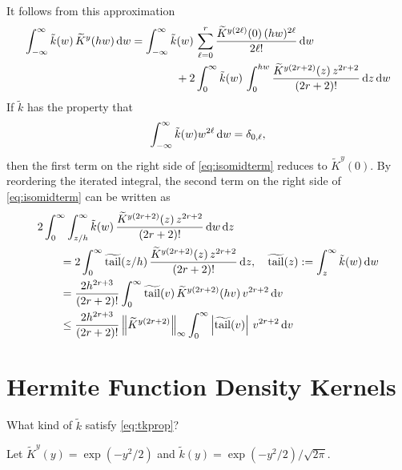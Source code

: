 \documentclass{amsart}
\newcommand{\tKY}{\widetilde{K}^y}
\newcommand{\tk}{\tilde{k}}
\DeclareMathOperator{\ttk}{\widetilde{tail}}
\begin{document}
It follows from this approximation 
\begin{align} \label{eq:isomidterm}
	\int_{-\infty}^{\infty} \tk(w) \, \tKY(hw) \, \dif w & = 
	\int_{-\infty}^{\infty} \tk(w) \, \sum_{\ell = 0}^{r} \frac{\tK^{y(2\ell)}(0) \, (hw)^{2\ell}}{2\ell!}  \, \dif w \\
	& 
	\nonumber
	\qquad \qquad 
	+ 2 \int_{0}^{\infty} \tk(w) \,  \int_0^{hw} \frac{\tK^{y(2r+2)}(z) \,  z^{2r+2}}{(2r+2)!} \, \dif z  \, \dif w
\end{align}
If $\tk$ has the property that 
\begin{equation} \label{eq:tkprop}
	\int_{-\infty}^{\infty} \tk(w) w^{2\ell}  \, \dif w =  \delta_{0,\ell},
\end{equation} 
then the first term on the right side of \eqref{eq:isomidterm} reduces to $\tKY(0)$.   By reordering the iterated integral, the  second term on the right side of  \eqref{eq:isomidterm} can be written as 
\begin{align*}
	\MoveEqLeft{2 \int_{0}^{\infty}  \int_{z/h}^\infty \tk(w) \, \frac{\tK^{y(2r+2)}(z) \,  z^{2r+2}}{(2r+2)!}   \, \dif w \, \dif z} \\
	& =  2\int_{0}^{\infty}  \ttk(z/h) \, \frac{\tK^{y(2r+2)}(z) \,  z^{2r+2}}{(2r+2)!}    \, \dif z, 
	\quad \ttk(z) := \int_{z}^\infty \tk(w) \, \dif w \\
	& =  \frac{2h^{2r+3}}{(2r+2)!} \int_{0}^{\infty}  \ttk(v) \, \tK^{y(2r+2)}(hv) \,  v^{2r+2}    \, \dif v \\	
	&  \le  \frac{2h^{2r+3}}{(2r+2)!}  \norm[\infty]{\tK^{y(2r+2)}} \int_{0}^{\infty}  \abs{\ttk(v)}  \,  v^{2r+2}    \, \dif v \\	
\end{align*}

\section{Hermite Function Density Kernels}

What kind of $\tk$ satisfy \eqref{eq:tkprop}?













Let $\tKY(y) = \exp(-y^2/2)$ and $\tk(y) = \exp(-y^2/2)/\sqrt{2\pi}$.



\end{document}
